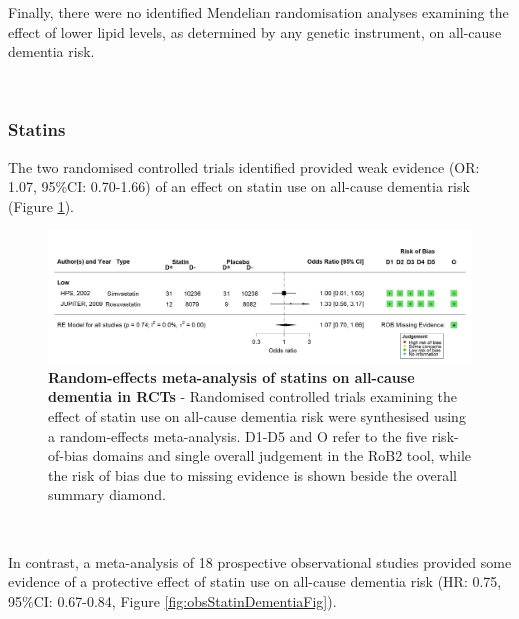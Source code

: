 \documentclass[a4paper, twoside]{templates/ociamthesis}
\begin{document}
\newpage

Finally, there were no identified Mendelian randomisation analyses examining the effect of lower lipid levels, as determined by any genetic instrument, on all-cause dementia risk.

~

\hypertarget{statins}{%
\subsubsection{Statins}\label{statins}}

The two randomised controlled trials identified provided weak evidence (OR: 1.07, 95\%CI: 0.70-1.66) of an effect on statin use on all-cause dementia risk (Figure \ref{fig:rctStatinDementiaFig}).






\begin{figure}[H]
\includegraphics[width=1\linewidth]{figures/sys-rev/fp_rct_statins_Dementia} \caption[Random-effects meta-analysis of statins on all-cause dementia in RCTs]{\textbf{Random-effects meta-analysis of statins on all-cause dementia in RCTs} -
Randomised controlled trials examining the effect of statin use on all-cause dementia risk were synthesised using a random-effects meta-analysis. D1-D5 and O refer to the five risk-of-bias domains and single overall judgement in the RoB2 tool, while the risk of bias due to missing evidence is shown beside the overall summary diamond.}\label{fig:rctStatinDementiaFig}
\end{figure}

~

In contrast, a meta-analysis of 18 prospective observational studies provided some evidence of a protective effect of statin use on all-cause dementia risk (HR: 0.75, 95\%CI: 0.67-0.84, Figure \ref{fig:obsStatinDementiaFig}).
\end{document}
